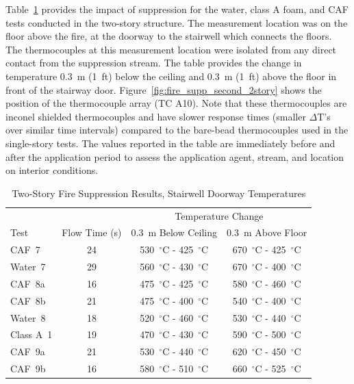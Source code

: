 \documentclass[12pt,oneside]{book}
\begin{document}
Table~\ref{tab:Test_Results_2} provides the impact of suppression for the water, class A foam, and CAF tests conducted in the two-story structure. The measurement location was on the floor above the fire, at the doorway to the stairwell which connects the floors. The thermocouples at this measurement location were isolated from any direct contact from the suppression stream. The table provides the change in temperature 0.3~m (1~ft) below the ceiling and 0.3~m (1~ft) above the floor in front of the stairway door. Figure~\ref{fig:fire_supp_second_2story} shows the position of the thermocouple array (TC A10). Note that these thermocouples are inconel shielded thermocouples and have slower response times (smaller $\Delta$T's over similar time intervals) compared to the bare-bead thermocouples used in the single-story tests. The values reported in the table are immediately before and after the application period to assess the application agent, stream, and location on interior conditions.

\begin{table}[!ht]
\centering
\caption{Two-Story Fire Suppression Results, Stairwell Doorway Temperatures}\label{tab:Test_Results_2}
\begin{tabular}{lccc}
\toprule[1.5pt]
           &               & \multicolumn{2}{c}{Temperature Change}                                    \\
Test 	   & Flow Time (s) & 0.3~m Below Ceiling                 & 0.3~m Above Floor	               \\
\midrule
CAF~7      & 24            & 530~$^{\circ}$C - 425~$^{\circ}$C   & 670~$^{\circ}$C - 425~$^{\circ}$C   \\[.25cm]
Water~7    & 29            & 560~$^{\circ}$C - 430~$^{\circ}$C   & 670~$^{\circ}$C - 400~$^{\circ}$C   \\[.25cm]
CAF~8a     & 16            & 475~$^{\circ}$C - 425~$^{\circ}$C   & 580~$^{\circ}$C - 460~$^{\circ}$C   \\
CAF~8b     & 21            & 475~$^{\circ}$C - 400~$^{\circ}$C   & 540~$^{\circ}$C - 400~$^{\circ}$C   \\[.25cm]
Water~8    & 18            & 520~$^{\circ}$C - 460~$^{\circ}$C   & 530~$^{\circ}$C - 440~$^{\circ}$C   \\[.25cm]
Class A~1  & 19            & 470~$^{\circ}$C - 430~$^{\circ}$C   & 590~$^{\circ}$C - 500~$^{\circ}$C   \\
CAF~9a     & 21            & 530~$^{\circ}$C - 440~$^{\circ}$C   & 620~$^{\circ}$C - 450~$^{\circ}$C   \\
CAF~9b     & 16            & 580~$^{\circ}$C - 510~$^{\circ}$C   & 660~$^{\circ}$C - 525~$^{\circ}$C   \\
\bottomrule[1.25pt]
\end{tabular}\par
\end{table}
\end{document}
